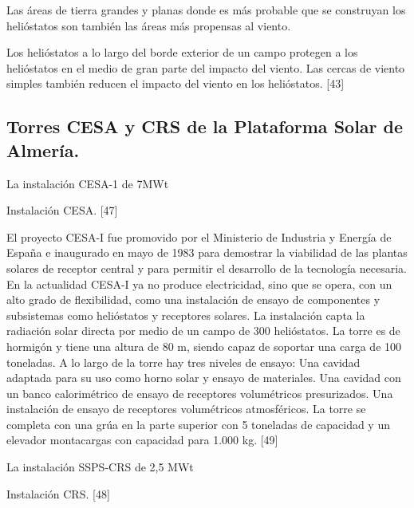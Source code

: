 \documentclass[12pt]{article}
\begin{document}
Las áreas de tierra grandes y planas donde es más probable que se construyan los helióstatos son también las áreas más propensas al viento.

Los helióstatos a lo largo del borde exterior de un campo protegen a los helióstatos en el medio de gran parte del impacto del viento. Las cercas de viento simples también reducen el impacto del viento en los helióstatos. [43]



\subsection{Torres CESA y CRS de la Plataforma Solar de Almería.}

La instalación CESA-1 de 7MWt


Instalación CESA. [47]

El proyecto CESA-I fue promovido por el Ministerio de Industria y Energía de España e inaugurado en mayo de 1983 para demostrar la viabilidad de las plantas solares de receptor central y para permitir el desarrollo de la tecnología necesaria. En la actualidad CESA-I ya no produce electricidad, sino que se opera, con un alto grado de flexibilidad, como una instalación de ensayo de componentes y subsistemas como helióstatos y receptores solares.
La instalación capta la radiación solar directa por medio de un campo de 300 helióstatos.
La torre es de hormigón y tiene una altura de 80 m, siendo capaz de soportar una carga de 100 toneladas. A lo largo de la torre hay tres niveles de ensayo:
Una cavidad adaptada para su uso como horno solar y ensayo de materiales.
Una cavidad con un banco calorimétrico de ensayo de receptores volumétricos presurizados.
Una instalación de ensayo de receptores volumétricos atmosféricos.
La torre se completa con una grúa en la parte superior con 5 toneladas de capacidad y un elevador montacargas con capacidad para 1.000 kg. [49]



La instalación SSPS-CRS de 2,5 MWt


Instalación CRS. [48]
\end{document}
